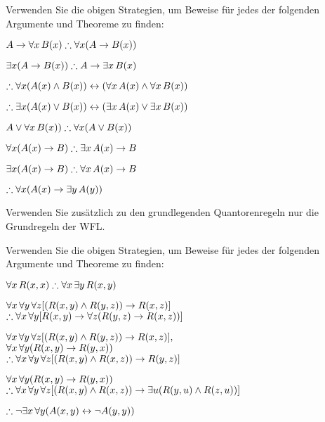 \problempart
Verwenden Sie die obigen Strategien, um Beweise für jedes der folgenden Argumente und Theoreme zu finden:
\begin{earg}
\item $A \eif \forall x\,\atom{B}{x} \therefore \forall x(A \eif \atom{B}{x})$
\item $\exists x(A \eif \atom{B}{x}) \therefore A \eif \exists x\, \atom{B}{x}$
\item $\therefore \forall x(\atom{A}{x} \eand \atom{B}{x}) \eiff (\forall x\,\atom{A}{x} \eand \forall x\,\atom{B}{x})$
\item $\therefore \exists x(\atom{A}{x} \eor \atom{B}{x}) \eiff (\exists x\,\atom{A}{x} \eor \exists x\,\atom{B}{x})$
\item $A \eor \forall x\,\atom{B}{x}) \therefore \forall x(A \eor \atom{B}{x})$
\item $\forall x(\atom{A}{x} \eif B) \therefore \exists x\,\atom{A}{x} \eif B$
\item $\exists x(\atom{A}{x} \eif B) \therefore \forall x\,\atom{A}{x} \eif B$
\item $\therefore \forall x(\atom{A}{x} \eif \exists y\,\atom{A}{y})$
\end{earg}
Verwenden Sie zusätzlich zu den grundlegenden Quantorenregeln nur die Grundregeln der WFL.

\problempart
Verwenden Sie die obigen Strategien, um Beweise für jedes der folgenden Argumente und Theoreme zu finden:
\begin{earg}
\item $\forall x\,\atom{R}{x,x} \therefore \forall x\,\exists y\,\atom{R}{x,y}$
\item $\forall x\,\forall y\,\forall z[(\mathord{R}(x,y) \wedge \mathord{R}(y,z)) \rightarrow \mathord{R}(x,z)]$ \\
$\therefore \forall x\,\forall y[\atom{R}{x,y} \eif \forall z(\atom{R}{y,z} \eif \atom{R}{x,z})]$
\item $\forall x\,\forall y\,\forall z[(\mathord{R}(x,y) \wedge \mathord{R}(y,z)) \rightarrow \mathord{R}(x,z)],$\\ $\forall x\,\forall y(\mathord{R}(x,y) \rightarrow \mathord{R}(y, x))$ \\ $\therefore \forall x\,\forall y\,\forall z[(\atom{R}{x,y} \eand \atom{R}{x,z}) \eif \atom{R}{y,z}]$
\item $\forall x\,\forall y(\mathord{R}(x,y) \rightarrow \mathord{R}(y, x))$ \\$\therefore \forall x\,\forall y\,\forall z[(\atom{R}{x,y} \eand \atom{R}{x,z}) \eif \exists u(\atom{R}{y,u} \eand \atom{R}{z,u})]$
\item $\therefore \enot \exists x\,\forall y (\atom{A}{x, y} \eiff \lnot\atom{A}{y, y})$
\end{earg}

